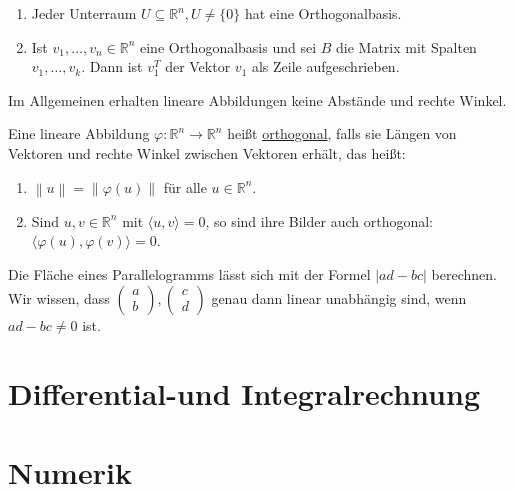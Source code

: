 \documentclass{mg2}
\begin{document}
\begin{satz}[Orthogonalbasis]
\begin{enumerate}
\item Jeder Unterraum $U \subseteq \mathbb{R}^n, U \neq \{0\}$ hat eine Orthogonalbasis.
\item Ist $v_1, \dots, v_n \in \mathbb{R}^n$ eine Orthogonalbasis und sei $B$ die Matrix mit Spalten $v_1, \dots, v_k$. Dann ist $v_1^T$ der Vektor $v_1$ als Zeile aufgeschrieben.
\end{enumerate}
\end{satz}

\begin{beobachtung}
Im Allgemeinen erhalten lineare Abbildungen keine Abstände und rechte Winkel.
\end{beobachtung}

\begin{definition}
Eine lineare Abbildung $\varphi: \mathbb{R}^n \to \mathbb{R}^n$ heißt \underline{orthogonal}, falls sie Längen von Vektoren und rechte Winkel zwischen Vektoren erhält, das heißt:
\begin{enumerate}
\item $\left\| u \right\| = \left\| \varphi(u) \right\|$ für alle $u \in \mathbb{R}^n$.
\item Sind $u, v \in \mathbb{R}^n$ mit $\langle u,v \rangle = 0$, so sind ihre Bilder auch orthogonal: $\langle \varphi(u), \varphi(v) \rangle = 0$.
\end{enumerate}
\end{definition}

Die Fläche eines Parallelogramms lässt sich mit der Formel $|ad-bc|$ berechnen. Wir wissen, dass $\begin{pmatrix}a\\b\end{pmatrix}, \begin{pmatrix}c\\d\end{pmatrix}$ genau dann linear unabhängig sind, wenn $ad-bc \neq 0$ ist.
\section{Differential-und Integralrechnung}

\section{Numerik}
\end{document}
